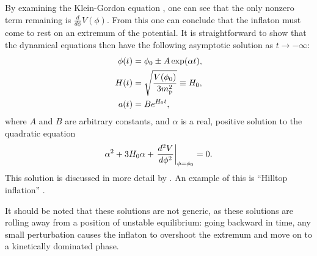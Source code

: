 By examining the Klein-Gordon equation
, one can see that the
only nonzero term remaining is $\frac{d}{d\phi}V(\phi)$. From this
one can conclude that the inflaton must come to rest on an extremum of
the potential. It is straightforward to show that the dynamical
equations then have the following asymptotic solution as $t \to
-\infty$:
%
\begin{align}
  \phi(t)
  &=
  \phi_0 \pm A \exp(\alpha t),\\
  H(t)
  &=
  \sqrt{\frac{V(\phi_0)}{3m_{\mathrm{p}}^2}} \equiv H_0,\\
  a(t)
  &=
  B e^{H_0t},
\end{align}
%
where $A$ and $B$  are arbitrary constants, and $\alpha$ is a real,
positive solution to the quadratic equation
% 
%
\begin{equation}
  \alpha^2 + 3H_0\alpha + \left.
  \frac{{d^2}V}{{d}\phi^2}\right|_{\phi=\phi_0}=0.
\end{equation}
%
This solution is discussed in more detail by
\citet{destri_preinflationary_2010}. An example of this is ``Hilltop
inflation'' \citep{linde_1982,albrecht_1982}. 

It should be noted that these solutions are not generic, as these
solutions are rolling away from a position of unstable equilibrium:
going backward in time, any small perturbation causes the inflaton to
overshoot the extremum and move on to a kinetically dominated phase.

